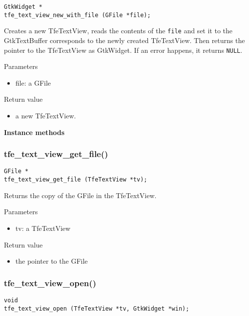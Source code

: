 \begin{lstlisting}
GtkWidget *
tfe_text_view_new_with_file (GFile *file);
\end{lstlisting}

Creates a new TfeTextView, reads the contents of the
\passthrough{\lstinline!file!} and set it to the GtkTextBuffer
corresponds to the newly created TfeTextView. Then returns the pointer
to the TfeTextView as GtkWidget. If an error happens, it returns
\passthrough{\lstinline!NULL!}.

Parameters

\begin{itemize}
\tightlist
\item
  file: a GFile
\end{itemize}

Return value

\begin{itemize}
\tightlist
\item
  a new TfeTextView.
\end{itemize}

\textbf{Instance methods}

\subsubsection{tfe\_text\_view\_get\_file()}\label{tfe_text_view_get_file}

\begin{lstlisting}
GFile *
tfe_text_view_get_file (TfeTextView *tv);
\end{lstlisting}

Returns the copy of the GFile in the TfeTextView.

Parameters

\begin{itemize}
\tightlist
\item
  tv: a TfeTextView
\end{itemize}

Return value

\begin{itemize}
\tightlist
\item
  the pointer to the GFile
\end{itemize}

\subsubsection{tfe\_text\_view\_open()}\label{tfe_text_view_open}

\begin{lstlisting}
void
tfe_text_view_open (TfeTextView *tv, GtkWidget *win);
\end{lstlisting}


